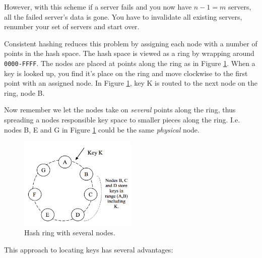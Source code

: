 However, with this scheme if a server fails and you now have $n-1=m$ servers, all the failed server's data is gone.
You have to invalidate all existing servers, renumber your set of servers and start over.

Consistent hashing reduces this problem by assigning each node with a number of points in the hash space.
The hash space is viewed as a ring by wrapping around \texttt{0000-FFFF}. The nodes are placed at points along the ring as in Figure \ref{fig:hashring}. When a key is looked up, you find it's place on the ring and move clockwise to the first point with an assigned node. In Figure \ref{fig:hashring}, key K is routed to the next node on the ring, node B.

Now remember we let the nodes take on \emph{several} points along the ring, thus spreading a nodes responsible key space to smaller pieces along the ring.
I.e. nodes B, E and G in Figure \ref{fig:hashring} could be the same \emph{physical} node.

\begin{figure}[h]
    \centering
    \includegraphics[width=0.5\textwidth]{introduction/hashring}
    \caption{Hash ring with several nodes\cite{dynamo}.}
    \label{fig:hashring}
\end{figure}

This approach to locating keys has several advantages:

